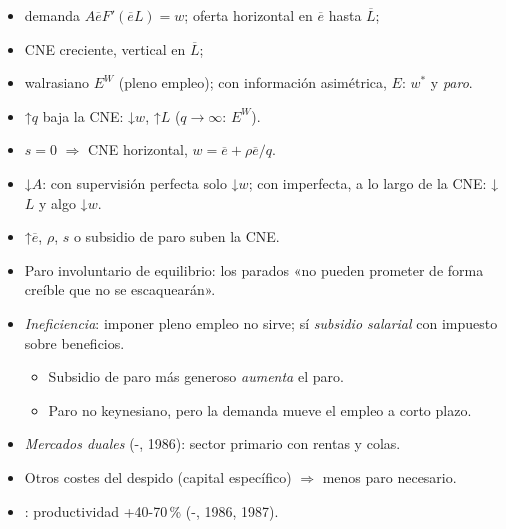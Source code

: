 \documentclass{article}
\begin{document}
\begin{columnas}
\begin{itemize}
  \begin{itemize}
  \item demanda $A\overline{e}F'(\overline{e}L)=w$; oferta horizontal en $\overline{e}$ hasta $\overline{L}$;
  \item CNE creciente, vertical en $\overline{L}$;
  \item walrasiano $E^W$ (pleno empleo); con información asimétrica, $E$: $w^*$ y \emph{paro}.
  \end{itemize}
\end{itemize}
\begin{itemize}
\item ↑$q$ baja la CNE: ↓$w$, ↑$L$ ($q\to\infty$: $E^W$).
\item $s=0$ $\Rightarrow$ CNE horizontal, $w=\overline{e}+\rho\overline{e}/q$.
\item ↓$A$: con supervisión perfecta solo ↓$w$; con imperfecta, a lo largo de la CNE: ↓$L$ y algo ↓$w$.
\item ↑$\overline{e}$, $\rho$, $s$ o subsidio de paro suben la CNE.
\end{itemize}
\begin{itemize}
\item Paro involuntario de equilibrio: los parados «no pueden prometer de forma creíble que no se escaquearán».
\item \emph{Ineficiencia}: imponer pleno empleo no sirve; sí \emph{subsidio salarial} con impuesto sobre beneficios.
  \begin{itemize}
  \item Subsidio de paro más generoso \emph{aumenta} el paro.
  \item Paro no keynesiano, pero la demanda mueve el empleo a corto plazo.
  \end{itemize}
\end{itemize}
\begin{itemize}
\item \emph{Mercados duales} (-, 1986): sector primario con rentas y colas.
\item Otros costes del despido (capital específico) $\Rightarrow$ menos paro necesario.
\end{itemize}
\begin{itemize}
\item {}: productividad +40-70\,\% (-, 1986, 1987).

\end{itemize}
\end{columnas}
\end{document}
